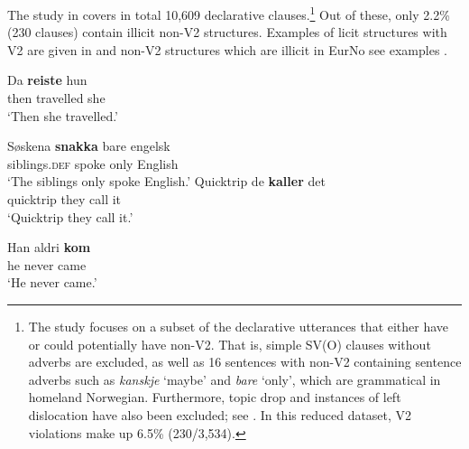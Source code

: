 \documentclass[output=paper]{langscibook}
\begin{document}
The study in \citet{WestergaardEtAl2021} covers in total 10,609 declarative clauses.{\footnote{The study focuses on a subset of the declarative utterances that either have or could potentially have non-V2. That is, simple SV(O) clauses without adverbs are excluded, as well as 16 sentences with non-V2 containing sentence adverbs such as \textit{kanskje} \textrm{‘maybe’ and} \textrm{\textit{bare}} ‘only’, which are grammatical in homeland Norwegian. Furthermore, topic drop and instances of left dislocation have also been excluded; see \citet{BousquetteEtAl2021}. In this reduced dataset, V2 violations make up 6.5\% (230/3,534).}} 
Out of these, only 2.2\% (230 clauses) contain illicit non-V2 structures. Examples of licit structures with V2 are given in  and non-V2 structures which are illicit in EurNo see examples .

\ea%
    \label{ex:anderssen:9}
    \ea  \gll Da \textbf{reiste} hun\\
    then travelled she\\
	\glt    ‘Then she travelled.’

	  \ex \gll Søskena          \textbf{snakka} bare engelsk\\
	    siblings.\textsc{def} spoke    only English\\
	\glt    ‘The siblings only spoke English.’
	\z
\ex%
    \label{ex:anderssen:10}
    \ea \gll Quicktrip de    \textbf{kaller} det\\
    quicktrip  they call     it\\
    \glt ‘Quicktrip they call it.’

	\ex  \gll Han aldri   \textbf{kom}\\
	    he    never came\\
	\glt    ‘He never came.’
	\z
\z
\end{document}
